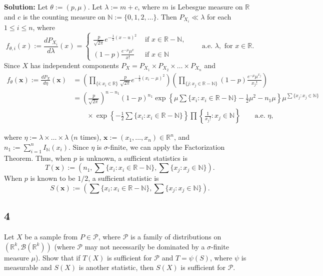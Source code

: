 \documentclass[12pt]{article}
\begin{document}
{\bf Solution:}
Let $\theta := (p, \mu)$. Let $\lambda := m + c$, where $m$ is Lebesgue measure on $\mathbb{R}$ and $c$ is the counting measure on $\mathbb{N} := \{0, 1, 2, \dots\}$.
Then $P_{X_{i}} \ll \lambda$ for each $1 \leq i \leq n$, where 
\[
  f_{\theta, i}(x) := \frac{dP_{X_{i}}}{d\lambda}(x) = \left\{ \begin{array}{cl} 
      \frac{p}{\sqrt{2\pi}}e^{-\frac{1}{2}(x-u)^{2}} & \text{ if } x \in \mathbb{R} - \mathbb{N}, \\
      (1-p)\frac{e^{-\mu}\mu^{x}}{x!} & \text{ if } x \in \mathbb{N}
  \end{array} \right. \qquad \text{a.e. }\lambda, \text{ for }x \in \mathbb{R}.
\]
Since $X$ has independent components $P_{X} = P_{X_{1}} \times P_{X_{2}} \times \dots \times P_{X_{n}}$ and 
\begin{align*}
  f_{\theta}(\bm{x}) := \frac{dP_{X}}{d\eta}(\bm{x}) & = \left( \prod_{\{i : x_{i} \in \mathbb{R}\}}\frac{p}{\sqrt{2\pi}}e^{-\frac{1}{2}(x_{i} -
  \mu)^{2}} \right)
  \left( \prod_{\{j : x_{j} \in \mathbb{R}-\mathbb{N}\}}(1-p)\frac{e^{-\mu}\mu^{x_{j}}}{x_{j}!} \right) \\
  & = \left( \frac{p}{\sqrt{2\pi}} \right)^{n - n_{1}}(1-p)^{n_{1}}\exp\left\{\mu\sum\{x_{i} : x_{i} \in \mathbb{R}-\mathbb{N}\} - \frac{1}{2}\mu^{2}
  -n_{1}\mu\right\} \mu^{\sum\{x_{j}:x_{j}\in\mathbb{N}\}} \\
  & \qquad \times \exp\left\{-\frac{1}{2}\sum\{x_i : x_{i}\in\mathbb{R} - \mathbb{N}\}\right\} \prod\left\{\frac{1}{x_j!} : x_{j} \in
  \mathbb{N}\right\}
  \qquad \text{a.e. }\eta, 
\end{align*}

where $\eta := \lambda \times \dots \times \lambda$ ($n$ times), $\bm{x} := (x_{1}, \dots, x_{n}) \in \mathbb{R}^{n}$, and $n_{1} :=
\sum_{i=1}^{n}I_{\mathbb{N}}(x_{i})$. Since $\eta$ is $\sigma$-finite, we can apply the Factorization Theorem. Thus, when $p$ is unknown, a sufficient
statistics is 
\[
  T(\bm{x}) := \left( n_{1}, \sum\{x_i : x_{i} \in \mathbb{R} - \mathbb{N}\}, \sum\{x_j : x_{j}\in\mathbb{N}\}\right).
\]
When $p$ is known to be $1/2$, a sufficient statistic is
\[
  S(\bm{x}) := \left( \sum\{x_i : x_{i} \in \mathbb{R} - \mathbb{N}\}, \sum\{x_j : x_{j}\in\mathbb{N}\}\right).
\]


\newpage
\subsection*{4}
\begin{tcolorbox}
  Let $X$ be a sample from $P\in\mathcal{P}$, where $\mathcal{P}$ is a family of distributions on $(\mathbb{R}^k,\mathcal{B}(\mathbb{R}^k))$ (where $\mathcal{P}$ may not necessarily be dominated by a $\sigma$-finite measure $\mu$).  Show that if $T(X)$ is sufficient for $\mathcal{P}$ and $T=\psi(S)$, where $\psi$ is measurable and $S(X)$ is another statistic, then $S(X)$ is sufficient for $\mathcal{P}$.
\end{tcolorbox}
\end{document}
